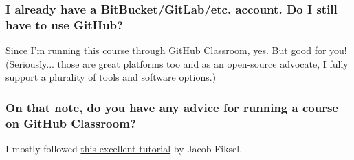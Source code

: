 \documentclass[12]{article}
\begin{document}
\vspace{-0.25cm}
\subsubsection*{I already have a BitBucket/GitLab/etc. account. Do I still have to use GitHub?}
Since I'm running this course through GitHub Classroom, yes. But good for you! (Seriously... those are great platforms too and as an open-source advocate, I fully support a plurality of tools and software options.)

\vspace{-0.25cm}
\subsubsection*{On that note, do you have any advice for running a course on GitHub Classroom?}
I mostly followed \href{https://github.com/jfiksel/github-classroom-for-teachers}{this excellent tutorial} by Jacob Fiksel.
\end{document}
